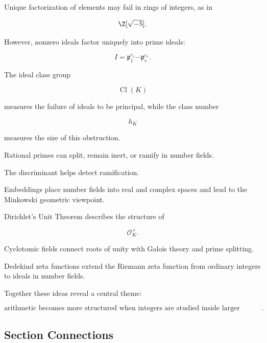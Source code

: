 Unique factorization of elements may fail in rings of integers, as in

\[ \Z[\sqrt{-5}]. \]

However, nonzero ideals factor uniquely into prime ideals:

\[ I=\mathfrak p_1^{e_1}\cdots\mathfrak p_r^{e_r}. \]

The ideal class group

\[ \operatorname{Cl}(K) \]

measures the failure of ideals to be principal, while the class number

\[ h_K \]

measures the size of this obstruction.

Rational primes can split, remain inert, or ramify in number fields.

The discriminant helps detect ramification.

Embeddings place number fields into real and complex spaces and lead to the
Minkowski geometric viewpoint.

Dirichlet's Unit Theorem describes the structure of

\[ \mathcal O_K^\times. \]

Cyclotomic fields connect roots of unity with Galois theory and prime
splitting.

Dedekind zeta functions extend the Riemann zeta function from ordinary
integers to ideals in number fields.

Together these ideas reveal a central theme:

\[
\boxed{
\text{arithmetic becomes more structured when integers are studied inside
larger algebraic systems}.
}
\]

\subsection{Section Connections}
\label{subsec:algebraic-number-theory-connections}


